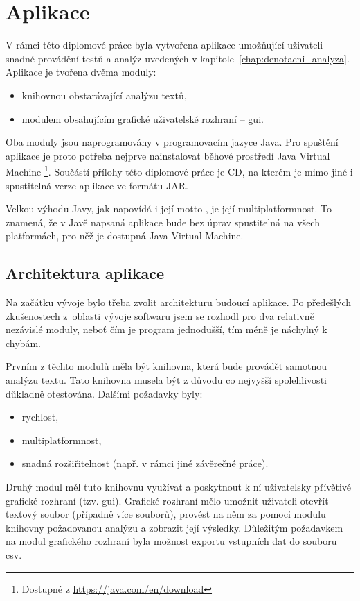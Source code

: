 \documentclass[dp.tex]{subfiles}
\begin{document}
\chapter{Aplikace}

V rámci této diplomové práce byla vytvořena aplikace umožňující uživateli snadné provádění testů a analýz uvedených v kapitole~\ref{chap:denotacni_analyza}. Aplikace je tvořena dvěma moduly:
\begin{itemize}
\item knihovnou obstarávající analýzu textů,
\item modulem obsahujícím grafické uživatelské rozhraní -- \acrshort{gui}.
\end{itemize}

Oba moduly jsou naprogramovány v programovacím jazyce Java. Pro spuštění aplikace je proto potřeba nejprve nainstalovat běhové prostředí Java Virtual Machine \footnote{Dostupné z \url {https://java.com/en/download}}. Součástí přílohy této diplomové práce je CD, na kterém je mimo jiné i spustitelná verze aplikace ve formátu JAR.

Velkou výhodu Javy, jak napovídá i její motto , je její multiplatformnost. To znamená, že v Javě napsaná aplikace bude bez úprav spustitelná na všech platformách, pro něž je dostupná Java Virtual Machine. 

\section{Architektura aplikace}

Na začátku vývoje bylo třeba zvolit architekturu budoucí aplikace. Po předešlých zkušenostech z~oblasti vývoje softwaru jsem se rozhodl pro dva relativně nezávislé moduly, neboť čím je program jednodušší, tím méně je náchylný k chybám. 

Prvním z těchto modulů měla být knihovna, která bude provádět samotnou analýzu textu. Tato knihovna musela být z důvodu co nejvyšší spolehlivosti důkladně otestována. Dalšími požadavky byly:
\begin{itemize}
\item rychlost,
\item multiplatformnost,
\item snadná rozšiřitelnost (např. v rámci jiné závěrečné práce).
\end{itemize}

Druhý modul měl tuto knihovnu využívat a poskytnout k ní uživatelsky přívětivé grafické rozhraní (tzv. \acrshort{gui}). Grafické rozhraní mělo umožnit uživateli otevřít textový soubor (případně více souborů), provést na něm za pomoci modulu knihovny požadovanou analýzu a zobrazit její výsledky. Důležitým požadavkem na modul grafického rozhraní byla možnost exportu vstupních dat do souboru \acrshort{csv}. 
\end{document}
